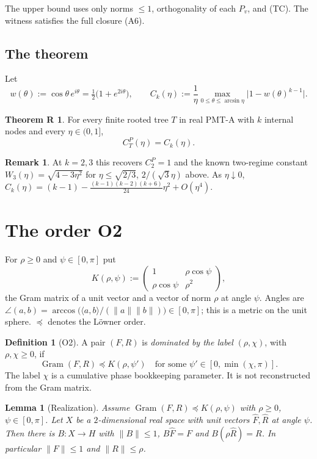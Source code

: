 \documentclass[11pt]{amsart}
\newtheorem{lemma}[theorem]{Lemma}
\theoremstyle{definition}
\newtheorem{definition}[theorem]{Definition}
\newtheorem*{remark}{Remark}
\newtheorem*{thmR}{Theorem R}
\newcommand{\Gram}{\operatorname{Gram}}
\newcommand{\norm}[1]{\lVert #1\rVert}
\newcommand{\ip}[2]{\langle #1,#2\rangle}
\newcommand{\PMTA}{\textsf{PMT-A}}
\begin{document}
The upper bound uses only norms $\le1$, orthogonality of each $P_v$, and (TC). The
witness satisfies the full closure (A6).

\subsection{The theorem}

Let
\[
w(\theta):=\cos\theta\,e^{i\theta}=\tfrac12\bigl(1+e^{2i\theta}\bigr),\qquad
C_k(\eta):=\frac1\eta\max_{0\le\theta\le\arcsin\eta}\bigl|1-w(\theta)^{k-1}\bigr|.
\]

\begin{thmR}
For every finite rooted tree $T$ in real \PMTA{} with $k$ internal nodes and every
$\eta\in(0,1]$,
\[
C^P_T(\eta)=C_k(\eta).
\]
\end{thmR}

\begin{remark}
At $k=2,3$ this recovers $C_2^P=1$ and the known two-regime constant
$W_3(\eta)=\sqrt{4-3\eta^2}$ for $\eta\le\sqrt{2/3}$, $2/(\sqrt3\eta)$ above.
As $\eta\downarrow0$, $C_k(\eta)=(k-1)-\frac{(k-1)(k-2)(k+6)}{24}\eta^2+O(\eta^4)$.
\end{remark}

\section{The order O2}\label{sec:O2}

For $\rho\ge0$ and $\psi\in[0,\pi]$ put
\[
K(\rho,\psi):=\begin{pmatrix}1&\rho\cos\psi\\ \rho\cos\psi&\rho^2\end{pmatrix},
\]
the Gram matrix of a unit vector and a vector of norm $\rho$ at angle $\psi$.
Angles are $\angle(a,b)=\arccos\bigl(\ip ab/(\norm a\norm b)\bigr)\in[0,\pi]$; this is a
metric on the unit sphere. $\preceq$ denotes the Löwner order.

\begin{definition}[O2]\label{def:O2}
A pair $(F,R)$ is \emph{dominated by the label} $(\rho,\chi)$, with $\rho,\chi\ge0$, if
\[
\Gram(F,R)\preceq K(\rho,\psi')\quad\text{for some }\psi'\in[0,\min(\chi,\pi)].
\]
The label $\chi$ is a cumulative phase bookkeeping parameter. It is not
reconstructed from the Gram matrix.
\end{definition}

\begin{lemma}[Realization]\label{lem:realization}
Assume $\Gram(F,R)\preceq K(\rho,\psi)$ with $\rho\ge0$, $\psi\in[0,\pi]$. Let $X$ be a
$2$-dimensional real space with unit vectors $\hat F,\hat R$ at angle $\psi$. Then
there is $B:X\to H$ with $\norm B\le1$, $B\hat F=F$ and $B(\rho\hat R)=R$. In particular
$\norm F\le1$ and $\norm R\le\rho$.
\end{lemma}
\end{document}
